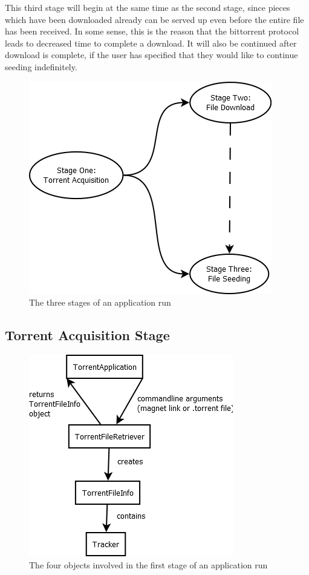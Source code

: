 \documentclass[letter]{scrartcl}
\begin{document}
This third stage will begin at the same time as the second stage, since pieces which have been downloaded already can be served up even before the entire file has been received.  In some sense, this is the reason that the bittorrent protocol leads to decreased time to complete a download.  It will also be continued after download is complete, if the user has specified that they would like to continue seeding indefinitely.

\begin{figure}[h]
\centering
\includegraphics[scale=.5]{stageDiagram.png}
\caption{The three stages of an application run}
\end{figure}

\subsection{Torrent Acquisition Stage}

\begin{figure}[h]
\centering
\includegraphics[scale=.5]{stepOne.png}
\caption{The four objects involved in the first stage of an application run}
\end{figure}
\end{document}
